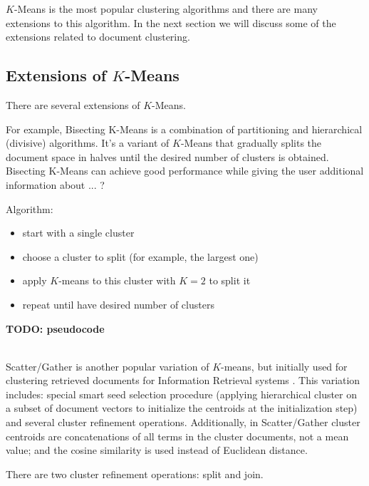 $K$-Means is the most popular clustering algorithms and there are 
many extensions to this algorithm. In the next section we will
discuss some of the extensions related to document clustering. 


\subsection{Extensions of $K$-Means} \label{sec:kmeans-ext}

There are several extensions of $K$-Means. 


For example, Bisecting K-Means \cite{steinbach2000comparison} is a combination 
of partitioning and hierarchical (divisive) algorithms. It's a variant of $K$-Means that 
gradually splits the document space in halves until the desired number of clusters 
is obtained. Bisecting K-Means can achieve good performance while 
giving the user additional information about ... ?

Algorithm:

\begin{itemize}
  \item start with a single cluster
  \item choose a cluster to split (for example, the largest one)
  \item apply $K$-means to this cluster with $K=2$ to split it
  \item repeat until have desired number of clusters
\end{itemize}


\textbf{TODO: pseudocode}


\ \\

Scatter/Gather is another popular variation of $K$-means, but 
initially used for clustering retrieved documents for Information 
Retrieval systems \cite{cutting1992scatter}. This variation
includes: special smart seed selection procedure (applying 
hierarchical cluster on a subset of document vectors to
initialize the centroids at the initialization step) and
several cluster refinement operations. 
Additionally, in Scatter/Gather cluster centroids are concatenations 
of all terms in the cluster documents, not a mean value;
and the cosine similarity is used instead of Euclidean 
distance. 


There are two cluster refinement operations: split and join.

